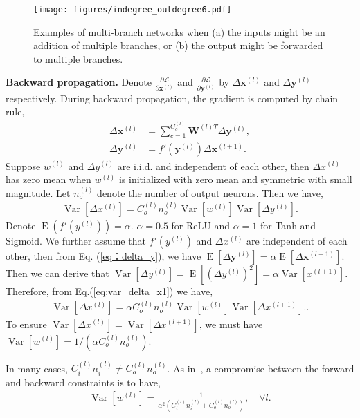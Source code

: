 \documentclass[10pt,twocolumn,letterpaper]{article}
\newcommand{\smalltitle}[1]{\vspace{0.2em}\noindent \textbf{{#1}}}
\newcommand{\W}{\mathbf{W}}
\newcommand{\bx}{\mathbf{x}}
\newcommand{\by}{\mathbf{y}}
\newcommand{\Var}{\operatorname{Var}}
\newcommand{\E}{\operatorname{E}}
\newcommand{\Loss}{\mathcal{L}}
\begin{document}
\begin{figure}[t]
	\begin{center}
		\texttt{[image: figures/indegree\_outdegree6.pdf]}
	\end{center}
	\caption{Examples of multi-branch networks when (a) the inputs might be an addition of multiple branches, or (b) the output might be forwarded to multiple branches. 
}
\label{fig:indegree_outdegree}
	\vspace{-1em}
\end{figure}

\smalltitle{Backward propagation. }
Denote $\frac{\partial \Loss}{\partial \bx^{(l)}}$ and $ \frac{\partial \Loss}{\partial \by^{(l)}}$ by $\Delta \bx^{(l)}$ and $\Delta \by^{(l)}$ respectively. During backward propagation, the gradient is computed by chain rule,
{\small
\begin{align}
\Delta \bx^{(l)} &= \sum_{c=1}^{C^{(l)}_o}\W^{(l)T} \Delta \by^{(l)}, \\
\Delta \by^{(l)} &= f'(\by^{(l)})\Delta \bx^{(l+1)}. \label{eq：delta_y}
\end{align}
}
\!\!Suppose $w^{(l)}$ and $\Delta y^{(l)}$ are i.i.d. and independent of each other, then $\Delta x^{(l)}$ has zero mean when $w^{(l)}$ is initialized with zero mean and symmetric with small magnitude. 
Let $n_o^{(l)}$ denote the number of output neurons. Then we have,
{\small
\begin{align}
\Var\left[\Delta x^{(l)}\right] = C_o^{(l)}n_o^{(l)}\Var[w^{(l)}]\Var[\Delta y^{(l)}]. \label{eq:var_delta_x1}
\end{align}
}
\!\!Denote $\E(f'(y^{(l)})) = \alpha$.  $\alpha=0.5$ for ReLU and $\alpha=1$ for Tanh and Sigmoid. 
We further assume that $f'(y^{(l)})$ and $\Delta x^{(l)}$ are independent of each other, then from Eq. (\ref{eq：delta_y}), we have $\E\left[\Delta \by^{(l)}\right] =\alpha \E\left[\Delta \bx^{(l+1)}\right].$
Then we can derive that $\Var[\Delta y^{(l)}] = \E[(\Delta y^{(l)})^2] = \alpha\Var[x^{(l+1)}]$.  
Therefore, from Eq.(\ref{eq:var_delta_x1}) we have,
{\small
\begin{align}
\Var\left[\Delta x^{(l)}\right] = \alpha C^{(l)}_on^{(l)}_o\Var[w^{(l)}]\Var[\Delta x^{(l+1)}]. \label{eq:var_delta_x2}.
\end{align} 
}
\!\!To ensure $\Var[\Delta x^{(l)}] = \Var[\Delta x^{(l+1)}]$, we must have $\Var[w^{(l)}] = 1/(\alpha C^{(l)}_on^{(l)}_o)$.

In many cases, $C^{(l)}_in^{(l)}_i \neq C^{(l)}_o n^{(l)}_o$. As in~\cite{glorot2010understanding}, a compromise between the forward and backward constraints is to have,
{\small
\begin{align}
\Var[w^{(l)}] = \frac{1}{\alpha^2 (C^{(l)}_i n^{(l)}_i + C^{(l)}_on^{(l)}_o)}, \quad \forall l.
\label{eq:iniSol}
\end{align}
}
\end{document}
